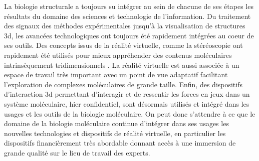 



La biologie structurale a toujours su intégrer au sein de chacune de ses étapes les résultats du domaine des sciences et technologie de l'information. Du traitement des signaux des méthodes expérimentales jusqu'à la visualisation de structures 3d, les avancées technologiques ont toujours été rapidement intégrées au coeur de ses outils. Des concepts issus de la réalité virtuelle, comme la stéréoscopie ont rapidement été utilisés pour mieux appréhender des contenus moléculaires intrinsèquement tridimensionnels \cite{van2000immersive,stone_immersive_2010,odonoghue_visualization_2010}. La réalité virtuelle est aussi associée à un espace de travail très important avec un point de vue adaptatif facilitant l'exploration de complexes moléculaires de grande taille. Enfin, des dispositifs d'interaction 3d permettant d'interagir et de ressentir les forces en jeux dans un système moléculaire, hier confidentiel, sont désormais utilisés et intégré dans les usages et les outils de la biologie moléculaire. On peut donc s'attendre à ce que le domaine de la biologie moléculaire continue d'intégrer dans ses usages les nouvelles technologies et dispositifs de réalité virtuelle, en particulier les dispositifs financièrement très abordable donnant accès à une immersion de grande qualité sur le lieu de travail des experts.

